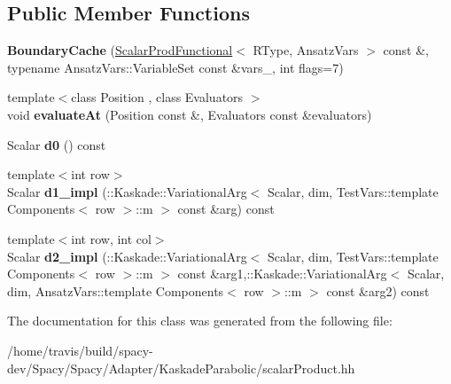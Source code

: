 \subsection*{Public Member Functions}
\begin{DoxyCompactItemize}
\item 
\hypertarget{classSpacy_1_1KaskadeParabolic_1_1OCP_1_1ScalarProdFunctional_1_1BoundaryCache_aa306eb61e77c910e648c397c4c1f2b32}{{\bfseries Boundary\-Cache} (\hyperlink{classSpacy_1_1KaskadeParabolic_1_1OCP_1_1ScalarProdFunctional}{Scalar\-Prod\-Functional}$<$ R\-Type, Ansatz\-Vars $>$ const \&, typename Ansatz\-Vars\-::\-Variable\-Set const \&vars\-\_\-, int flags=7)}\label{classSpacy_1_1KaskadeParabolic_1_1OCP_1_1ScalarProdFunctional_1_1BoundaryCache_aa306eb61e77c910e648c397c4c1f2b32}

\item 
\hypertarget{classSpacy_1_1KaskadeParabolic_1_1OCP_1_1ScalarProdFunctional_1_1BoundaryCache_a4f335d1dfbdfb92c11c2377ec7ae67ab}{{\footnotesize template$<$class Position , class Evaluators $>$ }\\void {\bfseries evaluate\-At} (Position const \&, Evaluators const \&evaluators)}\label{classSpacy_1_1KaskadeParabolic_1_1OCP_1_1ScalarProdFunctional_1_1BoundaryCache_a4f335d1dfbdfb92c11c2377ec7ae67ab}

\item 
\hypertarget{classSpacy_1_1KaskadeParabolic_1_1OCP_1_1ScalarProdFunctional_1_1BoundaryCache_a164380d1440ad8fa581081a21dd646ac}{Scalar {\bfseries d0} () const }\label{classSpacy_1_1KaskadeParabolic_1_1OCP_1_1ScalarProdFunctional_1_1BoundaryCache_a164380d1440ad8fa581081a21dd646ac}

\item 
\hypertarget{classSpacy_1_1KaskadeParabolic_1_1OCP_1_1ScalarProdFunctional_1_1BoundaryCache_a83d828c63de766568422ad8e05792acf}{{\footnotesize template$<$int row$>$ }\\Scalar {\bfseries d1\-\_\-impl} (\-::Kaskade\-::\-Variational\-Arg$<$ Scalar, dim, Test\-Vars\-::template Components$<$ row $>$\-::m $>$ const \&arg) const }\label{classSpacy_1_1KaskadeParabolic_1_1OCP_1_1ScalarProdFunctional_1_1BoundaryCache_a83d828c63de766568422ad8e05792acf}

\item 
\hypertarget{classSpacy_1_1KaskadeParabolic_1_1OCP_1_1ScalarProdFunctional_1_1BoundaryCache_aaf1c32ce0dd7eae0b8474c9f645f5f81}{{\footnotesize template$<$int row, int col$>$ }\\Scalar {\bfseries d2\-\_\-impl} (\-::Kaskade\-::\-Variational\-Arg$<$ Scalar, dim, Test\-Vars\-::template Components$<$ row $>$\-::m $>$ const \&arg1,\-::Kaskade\-::\-Variational\-Arg$<$ Scalar, dim, Ansatz\-Vars\-::template Components$<$ row $>$\-::m $>$ const \&arg2) const }\label{classSpacy_1_1KaskadeParabolic_1_1OCP_1_1ScalarProdFunctional_1_1BoundaryCache_aaf1c32ce0dd7eae0b8474c9f645f5f81}

\end{DoxyCompactItemize}


The documentation for this class was generated from the following file\-:\begin{DoxyCompactItemize}
\item 
/home/travis/build/spacy-\/dev/\-Spacy/\-Spacy/\-Adapter/\-Kaskade\-Parabolic/scalar\-Product.\-hh\end{DoxyCompactItemize}
